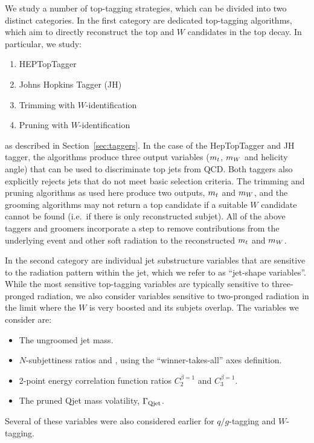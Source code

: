 We study a number of top-tagging strategies, which can be divided into two distinct categories. In the first category are dedicated top-tagging algorithms, which aim to directly reconstruct the top and $W$ candidates in the top decay. In particular, we study:
%
\begin{enumerate}
\item HEPTopTagger
\item Johns Hopkins Tagger (JH)
\item Trimming with $W$-identification
\item Pruning with $W$-identification
\end{enumerate}
%
as described in Section~\ref{sec:taggers}. 
In the case of the HepTopTagger and JH tagger, the algorithms produce three output variables ($m_{t}$, $m_{W}$ and helicity angle) that can be used to discriminate top jets from QCD. Both taggers also explicitly rejects jets that do not meet basic selection criteria. The trimming and pruning algorithms as used here produce two outputs, $m_{t}$ and $m_{W}$, and the grooming algorithms may not return a top candidate if a suitable $W$ candidate cannot be found (i.e.~if there is only reconstructed subjet). 
All of the above taggers and groomers incorporate a step to remove contributions from the underlying event and other soft radiation to the reconstructed $m_{t}$ and $m_{W}$.

In the second category are individual jet substructure variables that are sensitive to the radiation pattern within the jet, which we refer to as ``jet-shape variables''. While the most sensitive top-tagging variables are typically sensitive to three-pronged radiation, we also consider variables sensitive to two-pronged radiation in the limit where the $W$ is very boosted and its subjets overlap. The variables we consider are:
%
\begin{itemize}
\item The ungroomed jet mass.
\item $N$-subjettiness ratios \tautwoone and \tauthreetwo, using the ``winner-takes-all'' axes definition.
\item 2-point energy correlation function ratios $C_2^{\beta=1}$ and $C_3^{\beta=1}$.
\item The pruned Qjet mass volatility, $\Gamma_{\rm Qjet}$.
\end{itemize}
%
Several of these variables were also considered earlier for $q/g$-tagging and $W$-tagging.

